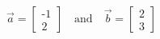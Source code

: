 \documentclass[preview]{standalone}
\begin{document}
\begin{align*}
\vec{a} = \begin{bmatrix} \text{-}1 \\ 2 \end{bmatrix} \quad \text{and} \quad \vec{b} = \begin{bmatrix} 2 \\ 3 \end{bmatrix}
\end{align*}
\end{document}
